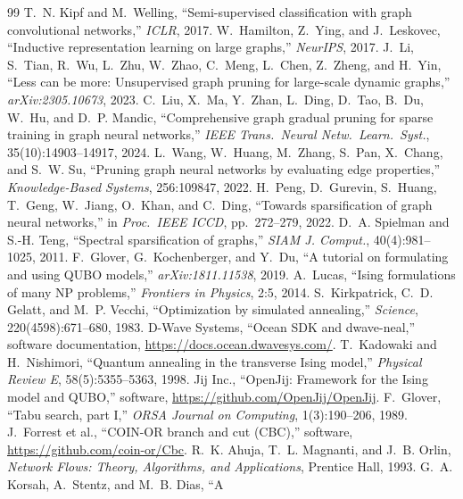 \documentclass[11pt]{article}
\begin{document}
\begin{thebibliography}{99}
\small
{} T.~N. Kipf and M.~Welling, ``Semi-supervised classification
with graph convolutional networks,'' \emph{ICLR}, 2017.
 W.~Hamilton, Z.~Ying, and J.~Leskovec, ``Inductive
representation learning on large graphs,'' \emph{NeurIPS}, 2017.
 J.~Li, S.~Tian, R.~Wu, L.~Zhu, W.~Zhao, C.~Meng, L.~Chen,
Z.~Zheng, and H.~Yin, ``Less can be more: Unsupervised graph pruning for
large-scale dynamic graphs,'' \emph{arXiv:2305.10673}, 2023.
 C.~Liu, X.~Ma, Y.~Zhan, L.~Ding, D.~Tao, B.~Du, W.~Hu,
and D.~P. Mandic, ``Comprehensive graph gradual pruning for sparse training in
graph neural networks,'' \emph{IEEE Trans.\ Neural Netw.\ Learn.\ Syst.},
35(10):14903--14917, 2024.
 L.~Wang, W.~Huang, M.~Zhang, S.~Pan, X.~Chang, and
S.~W. Su, ``Pruning graph neural networks by evaluating edge properties,''
\emph{Knowledge-Based Systems}, 256:109847, 2022.
 H.~Peng, D.~Gurevin, S.~Huang, T.~Geng, W.~Jiang, O.~Khan,
and C.~Ding, ``Towards sparsification of graph neural networks,'' in
\emph{Proc.\ IEEE ICCD}, pp.~272--279, 2022.
 D.~A. Spielman and S.-H. Teng, ``Spectral
sparsification of graphs,'' \emph{SIAM J. Comput.}, 40(4):981--1025, 2011.
 F.~Glover, G.~Kochenberger, and Y.~Du, ``A tutorial on
formulating and using QUBO models,'' \emph{arXiv:1811.11538}, 2019.
 A.~Lucas, ``Ising formulations of many NP problems,''
\emph{Frontiers in Physics}, 2:5, 2014.
 S.~Kirkpatrick, C.~D. Gelatt, and M.~P. Vecchi,
``Optimization by simulated annealing,'' \emph{Science}, 220(4598):671--680,
1983.
 D-Wave Systems, ``Ocean SDK and dwave-neal,'' software
documentation, \url{https://docs.ocean.dwavesys.com/}.
 T.~Kadowaki and H.~Nishimori, ``Quantum annealing in
the transverse Ising model,'' \emph{Physical Review E}, 58(5):5355--5363,
1998.
 Jij Inc., ``OpenJij: Framework for the Ising model and
QUBO,'' software, \url{https://github.com/OpenJij/OpenJij}.
 F.~Glover, ``Tabu search, part I,'' \emph{ORSA Journal on
Computing}, 1(3):190--206, 1989.
 J.~Forrest et al., ``COIN-OR branch and cut (CBC),'' software,
\url{https://github.com/coin-or/Cbc}.
 R.~K. Ahuja, T.~L. Magnanti, and J.~B. Orlin,
\emph{Network Flows: Theory, Algorithms, and Applications}, Prentice Hall,
1993.
 G.~A. Korsah, A.~Stentz, and M.~B. Dias, ``A

\end{thebibliography}
\end{document}
